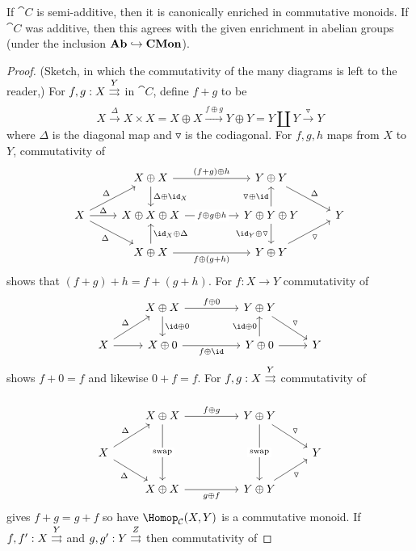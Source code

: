 \documentclass[../main.tex]{subfiles}
\begin{document}
\begin{lem}
	If $\cat C$ is semi-additive, then it is canonically enriched in commutative monoids. If $\cat C$ was additive, then this agrees with the given enrichment in abelian groups (under the inclusion $\mathbf{Ab} \hookrightarrow \mathbf{CMon}$).
\end{lem}
\begin{proof}(Sketch, in which the commutativity of the many diagrams is left to the reader,)
	For $f, g: X \xrightrightarrows Y$ in $\cat C$, define $f + g$ to be
	\[
		X \xrightarrow{\Delta} X \times X = X \oplus X \xrightarrow{f \oplus g} Y \oplus Y = Y \coprod Y \xrightarrow{\triangledown} Y
	\] where $\Delta$ is the diagonal map and $\triangledown$ is the codiagonal.
	For $f, g, h$ maps from $X$ to $Y$, commutativity of 
\[\begin{tikzcd}
	& {X\oplus X} && {Y\oplus Y} \\
	X & {X\oplus X\oplus X} && {Y\oplus Y\oplus Y} & Y \\
	& {X\oplus X} && {Y\oplus Y}
	\arrow["\Delta", from=2-1, to=1-2]
	\arrow["{\id_X \oplus \Delta}"', from=3-2, to=2-2]
	\arrow["{\Delta \oplus \id_X}", from=1-2, to=2-2]
	\arrow["\Delta", from=2-1, to=2-2]
	\arrow["\Delta"', from=2-1, to=3-2]
	\arrow["{f \oplus(g+h)}"', from=3-2, to=3-4]
	\arrow["{(f+g)\oplus h}", from=1-2, to=1-4]
	\arrow["{\triangledown \oplus \id}", from=2-4, to=1-4]
	\arrow["{\id_Y \oplus \triangledown}"', from=2-4, to=3-4]
	\arrow["\triangledown"', from=3-4, to=2-5]
	\arrow["\Delta", from=1-4, to=2-5]
	\arrow["{f\oplus g\oplus h}"{description}, from=2-2, to=2-4]
\end{tikzcd}\]	
	shows that $(f+g) + h = f + (g + h)$. For $f: X \to Y$ commutativity of 
\[\begin{tikzcd}
	& {X\oplus X} && {Y\oplus Y} \\
	X & {X \oplus 0} && {Y\oplus 0} & Y
	\arrow[from=2-1, to=2-2]
	\arrow["\id\oplus0", from=1-2, to=2-2]
	\arrow["\Delta", from=2-1, to=1-2]
	\arrow["{f\oplus \id}"', from=2-2, to=2-4]
	\arrow["{f\oplus 0}", from=1-2, to=1-4]
	\arrow["\triangledown", from=1-4, to=2-5]
	\arrow[from=2-4, to=2-5]
	\arrow["{\id \oplus 0}", from=2-4, to=1-4]
\end{tikzcd}\]	
	 shows $f + 0 = f$ and likewise $ 0 + f = f$.
	 For $f,g: X \xrightrightarrows Y$ commutativity of 
	
\[\begin{tikzcd}
	& {X\oplus X} && {Y\oplus Y} \\
	X &&&& Y \\
	& {X\oplus X} && {Y\oplus Y}
	\arrow["\triangledown", from=1-4, to=2-5]
	\arrow["\triangledown"', from=3-4, to=2-5]
	\arrow["{g \oplus f}"', from=3-2, to=3-4]
	\arrow["{f\oplus g}", from=1-2, to=1-4]
	\arrow["\Delta", from=2-1, to=1-2]
	\arrow["\Delta"', from=2-1, to=3-2]
	\arrow["{\text{swap}}"{description}, from=1-2, to=3-2]
	\arrow["{\text{swap}}"{description}, from=1-4, to=3-4]
\end{tikzcd}\]	 gives $f + g = g + f$ so have $\Hom_{\cat C}(X,Y)$ is a commutative monoid. If $f,f': X \xrightrightarrows Y$ and $g,g':Y  \xrightrightarrows Z$ then commutativity of 


\end{proof}
\end{document}
